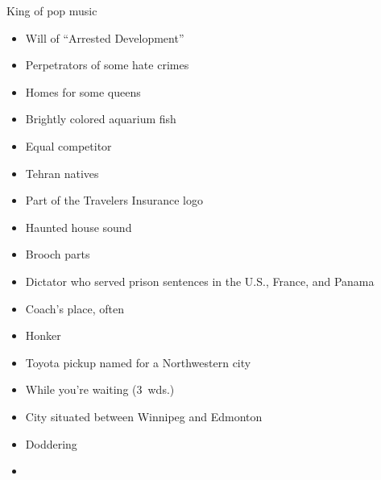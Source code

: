 {\begin{itemize}
        King of pop music
    \end{itemize}
  \item
    \begin{itemize}
      \item
        Will of ``Arrested Development''
      \item
        Perpetrators of some hate crimes
    \end{itemize}
  \item
    \begin{itemize}
      \item
        Homes for some queens
      \item
        Brightly colored aquarium fish
    \end{itemize}
  \item
    \begin{itemize}
      \item
        Equal competitor
      \item
        Tehran natives
    \end{itemize}
  \item
    \begin{itemize}
      \item
        Part of the Travelers Insurance logo
      \item
        Haunted house sound
    \end{itemize}
  \item
    \begin{itemize}
      \item
        Brooch parts
      \item
        Dictator who served prison sentences in the U.S., France, and Panama
    \end{itemize}
  \item
    \begin{itemize}
      \item
        Coach's place, often
      \item
        Honker
    \end{itemize}
}{%
  \item
    \begin{itemize}
      \item
        Toyota pickup named for a Northwestern city
      \item
        While you're waiting (3~wds.)
      \item
        City situated between Winnipeg and Edmonton
      \item
        Doddering
      \item

\end{itemize}}
